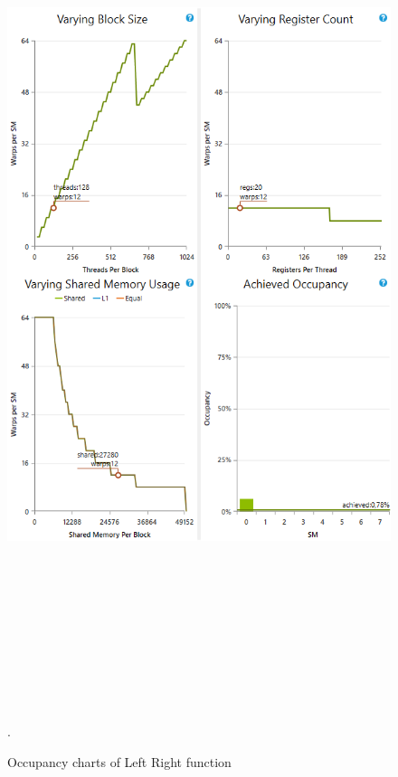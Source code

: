 \documentclass[oneside,openright,12pt,final,en]{mgr}
\begin{document}
\begin{figure}[H]
	\centering
	\includegraphics[width=\textwidth, height=26cm,keepaspectratio]{rightshift_occupancy_charts}.
	\caption{Occupancy charts of Left Right function}
	\label{fig:rightshift_occupancy_charts}
\end{figure}
\end{document}
